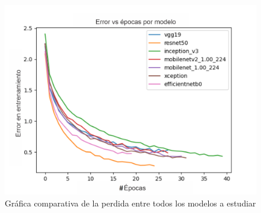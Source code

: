 \begin{figure}[h!]
\includegraphics[width=1\textwidth]{images/loss2.png}
\centering
\caption{Gráfica comparativa de la perdida entre todos los modelos a estudiar}
\label{fig:losses2}
\end{figure}

